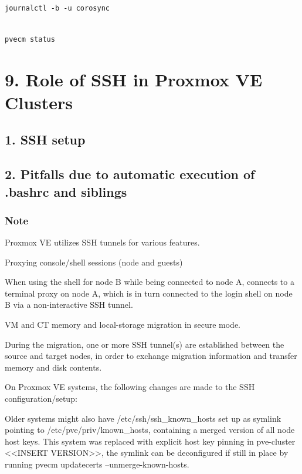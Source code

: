 \begin{lstlisting}

journalctl -b -u corosync

\end{lstlisting}

\begin{lstlisting}

pvecm status

\end{lstlisting}


\section{9. Role of SSH in Proxmox VE Clusters}

\subsection{1. SSH setup}

\subsection{2. Pitfalls due to automatic execution of .bashrc and siblings}

\subsubsection{Note}

Proxmox VE utilizes SSH tunnels for various features.

Proxying console/shell sessions (node and guests)

When using the shell for node B while being connected to node A, connects to a terminal proxy on node A, which is in turn connected to the login shell on node B via a non-interactive SSH tunnel.

VM and CT memory and local-storage migration in secure mode.

During the migration, one or more SSH tunnel(s) are established between the source and target nodes, in order to exchange migration information and transfer memory and disk contents.

On Proxmox VE systems, the following changes are made to the SSH configuration/setup:

Older systems might also have /etc/ssh/ssh_known_hosts set up as symlink pointing to /etc/pve/priv/known_hosts, containing a merged version of all node host keys. This system was replaced with explicit host key pinning in pve-cluster <<INSERT VERSION>>, the symlink can be deconfigured if still in place by running pvecm updatecerts --unmerge-known-hosts.

